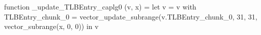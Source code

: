 function _update_TLBEntry_caplg0 (v, x) = let v = { v with TLBEntry_chunk_0 = vector_update_subrange(v.TLBEntry_chunk_0, 31, 31, vector_subrange(x, 0, 0)) } in v
